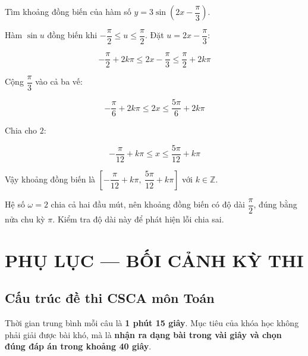 \documentclass[11pt, a4paper]{article}
\begin{document}
\begin{vidu}[{7}]
Tìm khoảng đồng biến của hàm số $y = 3\sin\left(2x - \dfrac{\pi}{3}\right)$.

Hàm $\sin u$ đồng biến khi $-\dfrac{\pi}{2} \le u \le \dfrac{\pi}{2}$. Đặt $u = 2x - \dfrac{\pi}{3}$:

$$-\frac{\pi}{2} + 2k\pi \le 2x - \frac{\pi}{3} \le \frac{\pi}{2} + 2k\pi$$

Cộng $\dfrac{\pi}{3}$ vào cả ba vế:

$$-\frac{\pi}{6} + 2k\pi \le 2x \le \frac{5\pi}{6} + 2k\pi$$

Chia cho $2$:

$$-\frac{\pi}{12} + k\pi \le x \le \frac{5\pi}{12} + k\pi$$

Vậy khoảng đồng biến là $\left[-\dfrac{\pi}{12} + k\pi,\ \dfrac{5\pi}{12} + k\pi\right]$ với $k \in \mathbb{Z}$.

 Hệ số $\omega = 2$ chia cả hai đầu mút, nên khoảng đồng biến có độ dài $\dfrac{\pi}{2}$, đúng bằng nửa chu kỳ $\pi$. Kiểm tra độ dài này để phát hiện lỗi chia sai.

\end{vidu}
\section{PHỤ LỤC — BỐI CẢNH KỲ THI}

\subsection{Cấu trúc đề thi CSCA môn Toán}


Thời gian trung bình mỗi câu là \textbf{1 phút 15 giây}. Mục tiêu của khóa học không phải giải được bài khó, mà là \textbf{nhận ra dạng bài trong vài giây và chọn đúng đáp án trong khoảng 40 giây}.
\end{document}
